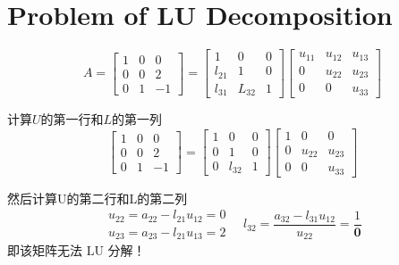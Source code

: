 \section{Problem of LU Decomposition}


\begin{example}
    \begin{equation} A=\left[\begin{array}{ccc}1 & 0 & 0 \\ 0 & 0 & 2 \\ 0 & 1 & -1\end{array}\right]=\left[\begin{array}{ccc}1 & 0 & 0 \\ l_{21} & 1 & 0 \\ l_{31} & L_{32} & 1\end{array}\right]\left[\begin{array}{ccc}u_{11} & u_{12} & u_{13} \\ 0 & u_{22} & u_{23} \\ 0 & 0 & u_{33}\end{array}\right] \end{equation}

    计算$U$的第一行和$L$的第一列
    \begin{equation}
        \left[\begin{array}{ccc}
                1 & 0 & 0  \\
                0 & 0 & 2  \\
                0 & 1 & -1
            \end{array}\right]=\left[\begin{array}{ccc}
                1 & 0      & 0 \\
                0 & 1      & 0 \\
                0 & l_{32} & 1
            \end{array}\right]\left[\begin{array}{ccc}
                1 & 0      & 0      \\
                0 & u_{22} & u_{23} \\
                0 & 0      & u_{33}
            \end{array}\right]
    \end{equation}

    然后计算U的第二行和L的第二列
    \begin{equation}
        \begin{array}{l}
            u_{22}=a_{22}-l_{21} u_{12}=0 \\
            u_{23}=a_{23}-l_{21} u_{13}=2
        \end{array} \quad l_{32}=\frac{a_{32}-l_{31} u_{12}}{u_{22}}=\frac{1}{\boldsymbol{0}}
    \end{equation}
    即该矩阵无法 $ \mathrm{LU} $ 分解！
\end{example}

